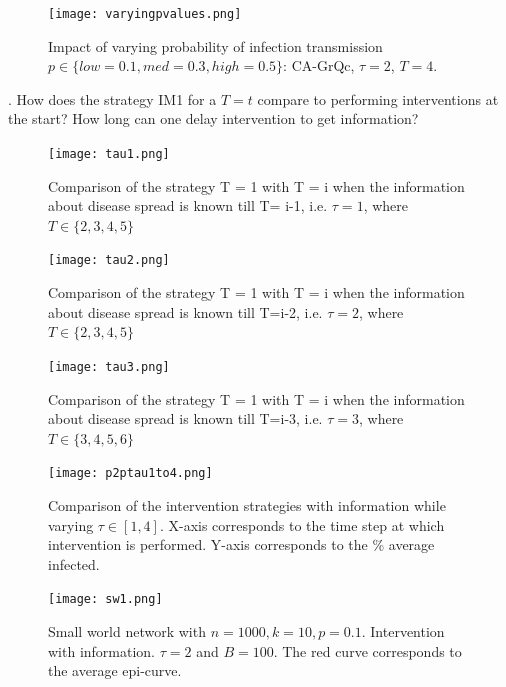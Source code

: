 \begin{figure}[!h]
    \centering
    \texttt{[image: varyingpvalues.png]}
    \caption{Impact of varying probability of infection transmission $p \in \{low =0.1, med = 0.3, high = 0.5\}$: CA-GrQc, $\tau = 2$, $T = 4$.}
    \label{fig:pvalue}
\end{figure}

. How does the strategy IM1 for a $T = t$ compare to performing interventions at the start? How long can one delay intervention to get information?

\begin{figure}[!h]
    \centering
    \texttt{[image: tau1.png]}
    \caption{Comparison of the strategy T = 1 with T = i when the information about disease spread is known till T= i-1, i.e. $\tau = 1$, where $T \in \{2, 3, 4, 5\}$}
    \label{fig:tau1}
\end{figure}

\begin{figure}[!h]
    \centering
    \texttt{[image: tau2.png]}
    \caption{Comparison of the strategy T = 1 with T = i when the information about disease spread is known till T=i-2, i.e. $\tau = 2$, where $T \in \{2, 3, 4, 5\}$}
    \label{fig:tau2}
\end{figure}

\begin{figure}[!h]
    \centering
    \texttt{[image: tau3.png]}
    \caption{Comparison of the strategy T = 1 with T = i when the information about disease spread is known till T=i-3, i.e. $\tau = 3$, where $T \in \{3, 4, 5, 6\}$}
    \label{fig:tau3}
\end{figure}

\begin{figure}[!h]
    \centering
    \texttt{[image: p2ptau1to4.png]}
    \caption{Comparison of the intervention strategies with information while varying $\tau \in [1,4]$. X-axis corresponds to the time step at which intervention is performed. Y-axis corresponds to the \% average infected.}
    \label{fig:p2p2tau1to4}
\end{figure}

\begin{figure}[!h]
    \centering
    \texttt{[image: sw1.png]}
    \caption{Small world network with $n = 1000, k = 10, p = 0.1$. Intervention with information. $\tau = 2$ and $B = 100$. The red curve corresponds to the average epi-curve.}
    \label{fig:sw1}
\end{figure}

\


